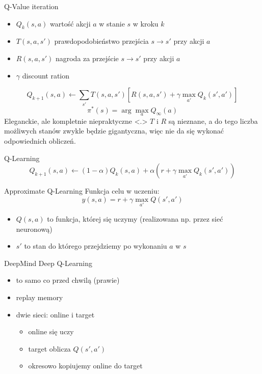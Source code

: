 \documentclass{sa}
\begin{document}
\begin{frame}{Q-Value iteration}
\begin{itemize}
\item $Q_k(s,a)$ wartość akcji $a$ w stanie $s$ w kroku $k$
\item $T(s, a, s')$ prawdopodobieństwo przejścia $s\to s'$ przy akcji $a$
\item $R(s, a, s')$ nagroda za przejście $s\to s'$ przy akcji $a$
\item $\gamma$ discount ration
\end{itemize}
\pause
\[ Q_{k+1}(s,a) \leftarrow \sum_{s'} T(s, a, s')\left[R(s,a,s') + \gamma \max_{a'} Q_k(s',a') \right] \]
\pause
\[ \pi^{*}(s) = \arg\max_{a} Q_{\infty}(a) \]
\pause
\alert{Eleganckie, ale kompletnie niepraktyczne}
\note<.>
{
$T$ i $R$ są nieznane, a do tego liczba możliwych stanów zwykle będzie gigantyczna, więc nie da się wykonać odpowiednich obliczeń.
}
\end{frame}

\begin{frame}{Q-Learning}
\[ Q_{k+1}(s,a) \leftarrow (1-\alpha) Q_k(s,a) + \alpha \left(r + \gamma \max_{a'} Q_k(s', a')\right) \]
\end{frame}

\begin{frame}{Approximate Q-Learning}
Funkcja celu w uczeniu:
\[ y(s, a) = r + \gamma\max_{a'} Q(s', a') \]
\begin{itemize}
\item $Q(s,a)$ to funkcja, której się uczymy (realizowana np. przez sieć neuronową)
\item $s'$ to stan do którego przejdziemy po wykonaniu $a$ w $s$
\end{itemize}
\end{frame}

\begin{frame}{DeepMind Deep Q-Learning}
\begin{itemize}
\item<+-> to samo co przed chwilą (prawie)
\item<+-> replay memory
\item<+-> dwie sieci: online i target
\begin{itemize}
\item<+-> online się uczy
\item<+-> target oblicza $Q(s',a')$
\item<+-> okresowo kopiujemy online do target
\end{itemize}
\end{itemize}
\end{frame}
\end{document}
